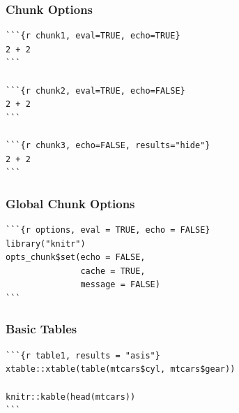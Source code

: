 \documentclass[14pt]{beamer}
\begin{document}

\frame{}



\begin{frame}[fragile]

\frametitle{Chunk Options}

\begin{verbatim}
```{r chunk1, eval=TRUE, echo=TRUE}
2 + 2
```

```{r chunk2, eval=TRUE, echo=FALSE}
2 + 2
```

```{r chunk3, echo=FALSE, results="hide"}
2 + 2
```
\end{verbatim}
\end{frame}


\begin{frame}[fragile]

\frametitle{Global Chunk Options}

\begin{verbatim}
```{r options, eval = TRUE, echo = FALSE}
library("knitr")
opts_chunk$set(echo = FALSE, 
               cache = TRUE, 
               message = FALSE)
```
\end{verbatim}
\end{frame}


\begin{frame}[fragile]
\frametitle{Basic Tables}

\small

\begin{verbatim}
```{r table1, results = "asis"}
xtable::xtable(table(mtcars$cyl, mtcars$gear))

knitr::kable(head(mtcars))
```
\end{verbatim}
\end{frame}
\end{document}
